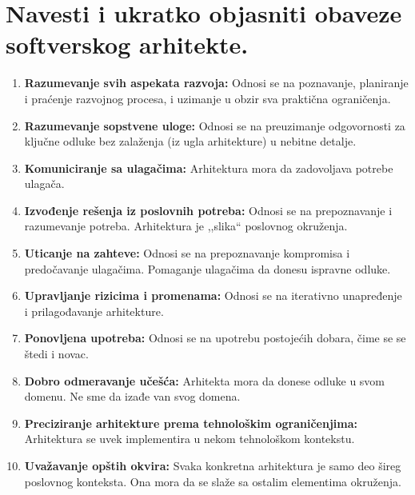 \documentclass[a4paper]{article}
\begin{document}
\section{Navesti i ukratko objasniti obaveze softverskog arhitekte.}
  \begin{enumerate}
    \item \textbf{Razumevanje svih aspekata razvoja:} Odnosi se na poznavanje, planiranje i
          praćenje razvojnog procesa, i uzimanje u obzir sva praktična ograničenja.
    \item \textbf{Razumevanje sopstvene uloge:} Odnosi se na preuzimanje odgovornosti za ključne odluke
          bez zalaženja (iz ugla arhitekture) u nebitne detalje.
    \item \textbf{Komuniciranje sa ulagačima:} Arhitektura mora da zadovoljava potrebe ulagača.
    \item \textbf{Izvođenje rešenja iz poslovnih potreba:} Odnosi se na prepoznavanje i razumevanje
          potreba. Arhitektura je ,,slika`` poslovnog okruženja.
    \item \textbf{Uticanje na zahteve:} Odnosi se na prepoznavanje kompromisa i predočavanje
          ulagačima. Pomaganje ulagačima da donesu ispravne odluke.
    \item \textbf{Upravljanje rizicima i promenama:} Odnosi se na iterativno unapređenje i 
          prilagođavanje arhitekture.
    \item \textbf{Ponovljena upotreba:} Odnosi se na upotrebu postojećih dobara, čime se
          se štedi i novac.
    \item \textbf{Dobro odmeravanje učešća:} Arhitekta mora da donese odluke u svom domenu.
          Ne sme da izađe van svog domena. 
    \item \textbf{Preciziranje arhitekture prema tehnološkim ograničenjima:} Arhitektura se uvek
          implementira u nekom tehnološkom kontekstu.
    \item \textbf{Uvažavanje opštih okvira:} Svaka konkretna arhitektura je samo deo šireg
          poslovnog konteksta. Ona mora da se slaže sa ostalim elementima okruženja.
  \end{enumerate}
\end{document}
